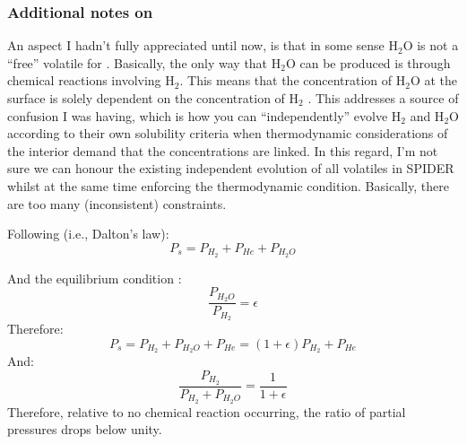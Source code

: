 \subsubsection{Additional notes on \cite{OS19}}
An aspect I hadn't fully appreciated until now, is that in some sense H$_2$O is not a ``free'' volatile for \cite{OS19}.  Basically, the only way that H$_2$O can be produced is through chemical reactions involving H$_2$.  This means that the concentration of H$_2$O at the surface is solely dependent on the concentration of H$_2$ \citep[Eq.~39,][]{OS19}.  This addresses a source of confusion I was having, which is how you can ``independently'' evolve H$_2$ and H$_2$O according to their own solubility criteria when thermodynamic considerations of the interior demand that the concentrations are linked.  In this regard, I'm not sure we can honour the existing independent evolution of all volatiles in SPIDER whilst at the same time enforcing the thermodynamic condition.  Basically, there are too many (inconsistent) constraints.

Following \cite[Eq.~35,][]{OS19} (i.e., Dalton's law):
\begin{equation}
P_s = P_{H_2} + P_{He} + P_{H_2O}
\end{equation}

And the equilibrium condition \citep[Eq.~36,][]{OS19}:
\begin{equation}
\frac{P_{H_2O}}{P_{H_2}} = \epsilon
\end{equation}
Therefore:
\begin{equation}
P_s = P_{H_2} + P_{H_2O} + P_{He} = (1+\epsilon) P_{H_2} + P_{He} %
\end{equation}
And:
\begin{equation}
\frac{P_{H_2}}{P_{H_2} + P_{H_2O}} = \frac{1}{1+\epsilon}
\end{equation}
Therefore, relative to no chemical reaction occurring, the ratio of partial pressures drops below unity.

